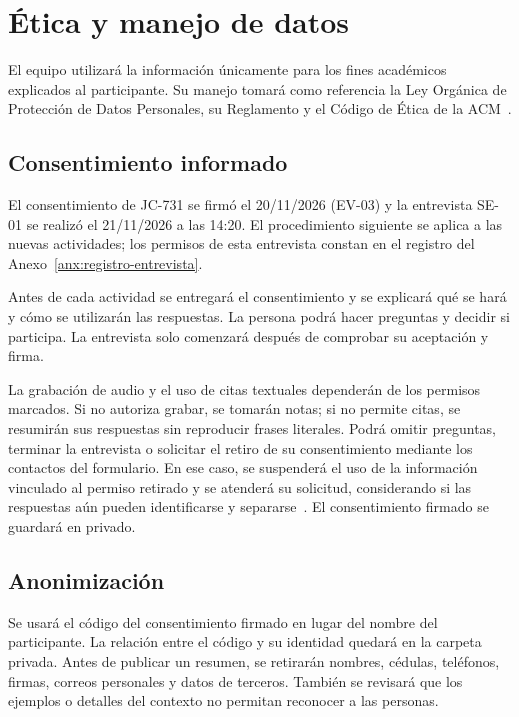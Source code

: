 \section{Ética y manejo de datos}\label{sec:etica}

El equipo utilizará la información únicamente para los fines académicos explicados al participante. Su manejo tomará como referencia la Ley Orgánica de Protección de Datos Personales, su Reglamento y el Código de Ética de la ACM~\cite{lopdp2021,rlopdp2023,acm2018}.

\subsection{Consentimiento informado}

El consentimiento de JC-731 se firmó el 20/11/2026 (EV-03) y la entrevista SE-01 se realizó el 21/11/2026 a las 14:20. El procedimiento siguiente se aplica a las nuevas actividades; los permisos de esta entrevista constan en el registro del Anexo~\ref{anx:registro-entrevista}.

Antes de cada actividad se entregará el consentimiento y se explicará qué se hará y cómo se utilizarán las respuestas. La persona podrá hacer preguntas y decidir si participa. La entrevista solo comenzará después de comprobar su aceptación y firma.

La grabación de audio y el uso de citas textuales dependerán de los permisos marcados. Si no autoriza grabar, se tomarán notas; si no permite citas, se resumirán sus respuestas sin reproducir frases literales. Podrá omitir preguntas, terminar la entrevista o solicitar el retiro de su consentimiento mediante los contactos del formulario. En ese caso, se suspenderá el uso de la información vinculado al permiso retirado y se atenderá su solicitud, considerando si las respuestas aún pueden identificarse y separarse~\cite{rlopdp2023}. El consentimiento firmado se guardará en privado.

\subsection{Anonimización}

Se usará el código del consentimiento firmado en lugar del nombre del participante. La relación entre el código y su identidad quedará en la carpeta privada. Antes de publicar un resumen, se retirarán nombres, cédulas, teléfonos, firmas, correos personales y datos de terceros. También se revisará que los ejemplos o detalles del contexto no permitan reconocer a las personas.

